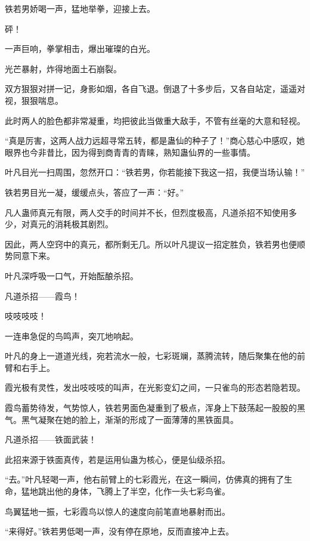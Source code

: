 
\begin{this_body}

铁若男娇喝一声，猛地举拳，迎接上去。

砰！

一声巨响，拳掌相击，爆出璀璨的白光。

光芒暴射，炸得地面土石崩裂。

双方狠狠对拼一记，身影如烟，各自飞退。倒退了十多步后，又各自站定，遥遥对视，狠狠喘息。

此时两人的脸色都非常凝重，均把彼此当做重大敌手，不管有丝毫的大意和轻视。

“真是厉害，这两人战力远超寻常五转，都是蛊仙的种子了！”商心慈心中感叹，她眼界也今非昔比，因为得到商青青的青睐，熟知蛊仙界的一些事情。

叶凡目光一扫周围，忽然开口：“铁若男，你若能接下我这一招，我便当场认输！”

铁若男目光一凝，缓缓点头，答应了一声：“好。”

凡人蛊师真元有限，两人交手的时间并不长，但烈度极高，凡道杀招不知使用多少，对真元的消耗极其剧烈。

因此，两人空窍中的真元，都所剩无几。所以叶凡提议一招定胜负，铁若男也便顺势同意下来。

叶凡深呼吸一口气，开始酝酿杀招。

凡道杀招——霞鸟！

吱吱吱吱！

一连串急促的鸟鸣声，突兀地响起。

叶凡的身上一道道光线，宛若流水一般，七彩斑斓，蒸腾流转，随后聚集在他的前臂和右手上。

霞光极有灵性，发出吱吱吱的叫声，在光影变幻之间，一只雀鸟的形态若隐若现。

霞鸟蓄势待发，气势惊人，铁若男面色凝重到了极点，浑身上下鼓荡起一股股的黑气。黑气凝聚在她的脸上，渐渐的形成了一面薄薄的黑铁面具。

凡道杀招——铁面武装！

此招来源于铁面真传，若是运用仙蛊为核心，便是仙级杀招。

“去。”叶凡轻喝一声，他右前臂上的七彩霞光，在这一瞬间，仿佛真的拥有了生命，猛地跳出他的身体，飞腾上了半空，化作一头七彩鸟雀。

鸟翼猛地一振，七彩霞鸟以惊人的速度向前笔直地暴射而出。

“来得好。”铁若男低喝一声，没有停在原地，反而直接冲上去。


\end{this_body}
